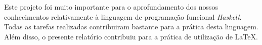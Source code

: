 \documentclass[a4paper]{article}
\begin{document}
Este projeto foi muito importante para o aprofundamento dos nossos conhecimentos
relativamente à linguagem de programação funcional \emph{Haskell}. Todas as tarefas
realizadas contribuiram bastante para a prática desta linguagem. Além disso, o 
presente relatório contribuiu para a prática de utilização de \LaTeX{}.
\end{document}
